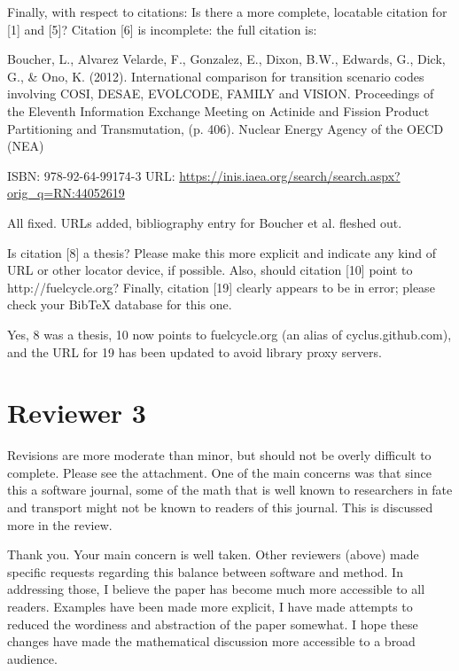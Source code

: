 \documentclass[answers,12pt]{exam}
\begin{document}
\begin{questions}
\question Finally, with respect to citations: 
Is there a more complete, locatable citation for [1] and [5]? Citation [6] is incomplete: the full citation is:

Boucher, L., Alvarez Velarde, F., Gonzalez, E., Dixon, B.W., Edwards, G., Dick, 
G., \& Ono, K. (2012). International comparison for transition scenario codes involving COSI, DESAE, EVOLCODE, FAMILY and VISION. Proceedings of the Eleventh Information Exchange Meeting on Actinide and Fission Product Partitioning and Transmutation, (p. 406). Nuclear Energy Agency of the OECD (NEA)

ISBN: 978-92-64-99174-3
URL: \url{https://inis.iaea.org/search/search.aspx?orig_q=RN:44052619}
\begin{solution}
All fixed. URLs added, bibliography entry for Boucher et al. fleshed out.
\end{solution}

\question Is citation [8] a thesis? Please make this more explicit and indicate any kind of URL or other locator device, if possible. Also, should citation [10] point to http://fuelcycle.org? Finally, citation [19] clearly appears to be in error; please check your BibTeX database for this one.
\begin{solution}
        Yes, 8 was a thesis, 10 now points to fuelcycle.org (an alias of 
        cyclus.github.com), and the URL for 19 has been updated to avoid 
        library proxy servers.
\end{solution}

\section*{Reviewer 3}

\question   Revisions are more moderate than minor, but should not be overly difficult
to complete. Please see the attachment. One of the main concerns was that since
this a software journal, some of the math that is well known to researchers in
fate and transport might not be known to readers of this journal. This is
discussed more in the review.
\begin{solution}
Thank you. Your main concern is well taken. Other reviewers (above) made 
        specific requests regarding this balance between software and method. 
        In addressing those, I believe the paper has become much more 
        accessible to all readers. Examples have been made more explicit, I 
        have made attempts to reduced the wordiness and abstraction of the 
        paper somewhat. I hope these changes have made the mathematical 
        discussion more accessible to a broad audience. 
\end{solution}


\end{questions}
\end{document}
